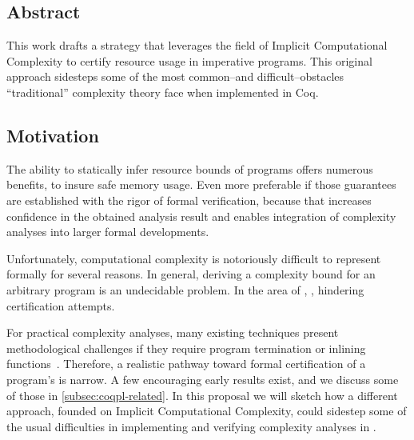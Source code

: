 
\subsection*{Abstract}

This work drafts a strategy that leverages the field of Implicit Computational
Complexity to certify resource usage in imperative programs. This original
approach sidesteps some of the most common--and difficult--obstacles
\enquote{traditional} complexity theory face when implemented in
Coq.

\subsection{Motivation}
\label{subsec:coqpl-motivation}

The ability to statically infer resource bounds of programs offers numerous
benefits, \eg to insure safe memory usage. Even more preferable if those
guarantees are established with the rigor of formal verification, because that
increases confidence in the obtained analysis result and enables integration of
complexity analyses into larger formal developments.

Unfortunately, computational complexity is notoriously difficult to represent
formally for several reasons. In general, deriving a complexity bound for an
arbitrary program is an undecidable problem. In the area
of , , hindering
certification attempts.

For practical complexity analyses, many existing
techniques present methodological challenges if they require \eg program
termination or inlining functions~\cite{carbonneaux2015}. Therefore, a realistic
pathway toward formal certification of a program's  is
narrow. A few encouraging early results exist, and we discuss some of those in
\autoref{subsec:coqpl-related}. In this proposal we will sketch how a different
approach, founded on Implicit Computational Complexity, could sidestep some of
the usual difficulties in implementing and verifying complexity analyses in
.

